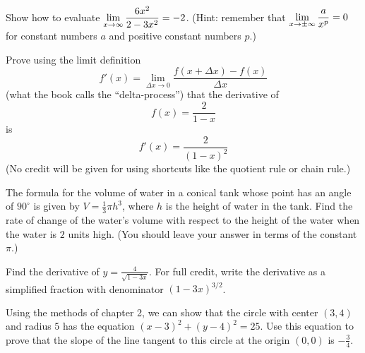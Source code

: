 \documentclass[12pt]{exam}
\newcommand{\ds}{\ensuremath{\displaystyle}}
\newcommand{\<}{\langle}
\renewcommand{\>}{\rangle}
\begin{document}
\begin{questions}

\setcounter{question}{8}

\question[20]
  Show how to evaluate \(\ds\lim_{x\to\infty}\frac{6x^2}{2-3x^2}=-2\).
  {\small (Hint: remember that \(\ds\lim_{x\to\pm\infty}\frac{a}{x^p}=0\) for
  constant numbers \(a\) and positive constant numbers \(p\).)}

\newpage

\question[20]
  Prove using the limit definition
    \[
      f'(x) = \lim_{\Delta x\to 0}\frac{f(x+\Delta x)-f(x)}{\Delta x}
    \]
  (what the book calls the ``delta-process'') that the derivative of
  \[f(x)=\frac{2}{1-x}\] is \[f'(x)=\frac{2}{(1-x)^2}\] (No credit will
  be given for using shortcuts like the quotient rule or chain rule.)

\newpage

\question[20]
  The formula for the volume of water in a conical tank whose point has
  an angle of \(90^\circ\) is given by \(V=\frac{1}{3}\pi h^3\), where
  \(h\) is the height of water in the tank. Find the rate of change of the
  water's volume with respect to the height of the water when the water
  is \(2\) units high. (You should leave your answer in terms of the
  constant \(\pi\).)

\newpage

\question[20]
  Find the derivative of \(y=\frac{4}{\sqrt{1-3x}}\). For full credit,
  write the derivative as a simplified fraction with denominator \((1-3x)^{3/2}\).

\newpage

\question[20]
  Using the methods of chapter 2, we can show that the circle with
  center \((3,4)\) and radius \(5\) has the equation
  \((x-3)^2+(y-4)^2=25\). Use this equation to prove that the slope
  of the line tangent to this circle at the origin \((0,0)\) is
  \(-\frac{3}{4}\).

\end{questions}
\end{document}
